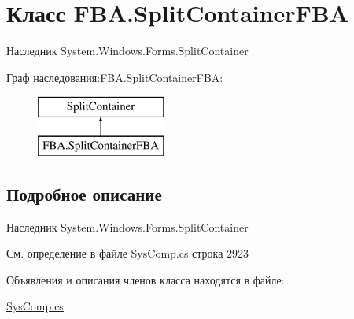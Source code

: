 \hypertarget{class_f_b_a_1_1_split_container_f_b_a}{}\section{Класс F\+B\+A.\+Split\+Container\+F\+BA}
\label{class_f_b_a_1_1_split_container_f_b_a}


Наследник System.\+Windows.\+Forms.\+Split\+Container  


Граф наследования\+:F\+B\+A.\+Split\+Container\+F\+BA\+:\begin{figure}[H]
\begin{center}
\leavevmode
\includegraphics[height=2.000000cm]{class_f_b_a_1_1_split_container_f_b_a}
\end{center}
\end{figure}


\subsection{Подробное описание}
Наследник System.\+Windows.\+Forms.\+Split\+Container 



См. определение в файле Sys\+Comp.\+cs строка 2923



Объявления и описания членов класса находятся в файле\+:\begin{DoxyCompactItemize}
\item 
\mbox{\hyperlink{_sys_comp_8cs}{Sys\+Comp.\+cs}}\end{DoxyCompactItemize}
